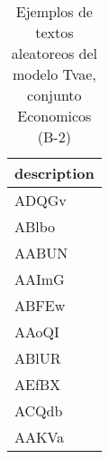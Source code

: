 \begin{table}[H]
\centering
\fontsize{8}{14}\selectfont
\caption{Ejemplos de textos aleatoreos del modelo Tvae, conjunto Economicos (B-2)}
\label{table-sample10-economicos-b-2-tvae-text}
\begin{tabular}{|m{50em}|}
\hline
\rowcolor[gray]{0.8}
description \\
\hline ADQGv \\
\hline ABlbo \\
\hline AABUN \\
\hline AAImG \\
\hline ABFEw \\
\hline AAoQI \\
\hline ABlUR \\
\hline AEfBX \\
\hline ACQdb \\
\hline AAKVa \\
\hline
\end{tabular}
\end{table}
